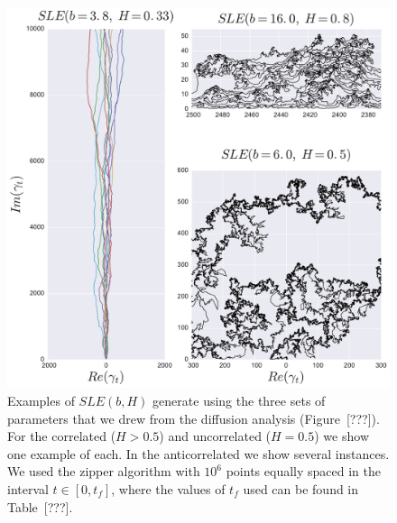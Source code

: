 \begin{figure}
\begin{center}
    \includegraphics[scale=0.5]{chapters/ch6-asle/figs/asle_traces}
\end{center}
\caption{Examples of $SLE(b,H)$ generate using the three sets of parameters
    that we drew from the diffusion analysis (Figure~[???]). For the correlated
    ($H>0.5$) and uncorrelated ($H=0.5$) we show one example of each. In the
    anticorrelated we show several instances. We used the zipper algorithm with
    $10^6$ points equally spaced in the interval $t\in[0, t_f]$, where the
    values of $t_f$ used can be found in Table~[???].}
\label{fig:asle_traces}
\end{figure}




